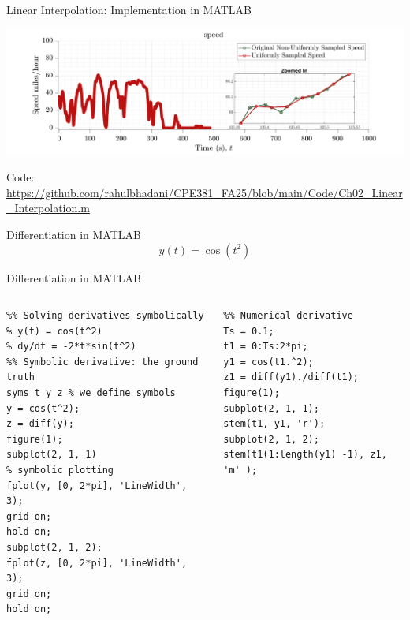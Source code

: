 \documentclass[aspectratio=169,xcolor=dvipsnames,svgnames,x11names,fleqn]{beamer}
\begin{document}
\begin{frame}{Linear Interpolation: Implementation in MATLAB}

\begin{center}

\includegraphics[width=1.0\linewidth]{../Code/figures/Ch02_Linear_Interpolation_Resampling.pdf}

\footnotesize 
Code: \url{https://github.com/rahulbhadani/CPE381_FA25/blob/main/Code/Ch02_Linear_Interpolation.m}
\end{center}




\end{frame}


\begin{frame}[containsverbatim]{Differentiation in MATLAB}
    $$
    y(t) = \cos(t^2)
    $$
\end{frame}
\begin{frame}[containsverbatim]{Differentiation in MATLAB}
    \footnotesize
\begin{columns}
    \begin{verbatim}
%% Solving derivatives symbolically
% y(t) = cos(t^2)
% dy/dt = -2*t*sin(t^2)
%% Symbolic derivative: the ground truth
syms t y z % we define symbols
y = cos(t^2);
z = diff(y);
figure(1);
subplot(2, 1, 1)
% symbolic plotting
fplot(y, [0, 2*pi], 'LineWidth', 3);
grid on;
hold on;
subplot(2, 1, 2);
fplot(z, [0, 2*pi], 'LineWidth', 3);
grid on;
hold on;
    \end{verbatim}
    \begin{verbatim}
%% Numerical derivative
Ts = 0.1;
t1 = 0:Ts:2*pi;
y1 = cos(t1.^2);
z1 = diff(y1)./diff(t1);
figure(1);
subplot(2, 1, 1);
stem(t1, y1, 'r');
subplot(2, 1, 2);
stem(t1(1:length(y1) -1), z1, 'm' );

    \end{verbatim}
\end{columns}
\end{frame}
\end{document}
